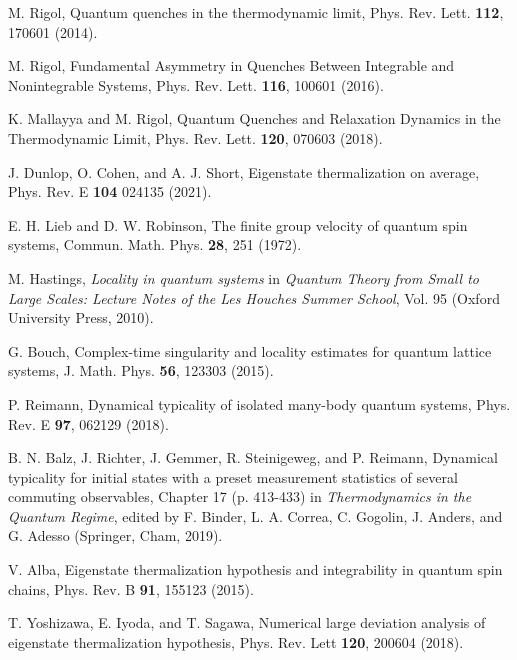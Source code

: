 \documentclass[twocolumn,aps,prb,floatfix,superscriptaddress]{revtex4-2}
\newcommand{\<}{\left\langle}	%
\renewcommand{\>}{\right\rangle}	%
\begin{document}
\begin{thebibliography}{70}
M. Rigol,
Quantum quenches in the thermodynamic limit,
Phys. Rev. Lett. {\bf 112}, 170601 (2014).

M. Rigol,
Fundamental Asymmetry in Quenches Between Integrable and Nonintegrable Systems,
Phys. Rev. Lett. {\bf 116}, 100601 (2016).

K. Mallayya and M. Rigol,
Quantum Quenches and Relaxation Dynamics in the Thermodynamic Limit,
Phys. Rev. Lett. {\bf 120}, 070603 (2018).

J. Dunlop, O. Cohen, and A. J. Short,
Eigenstate thermalization on average,
Phys. Rev. E {\bf 104}  024135 (2021).

E. H. Lieb and D. W. Robinson,
The finite group velocity of quantum spin systems,
Commun. Math. Phys. {\bf 28}, 251 (1972).

M. Hastings, {\em Locality in quantum systems} in {\em Quantum Theory from Small to Large Scales: Lecture Notes of the Les Houches Summer School}, Vol. 95 (Oxford University Press, 2010).

G. Bouch,
Complex-time singularity and locality estimates for quantum lattice systems,
J. Math. Phys. {\bf 56}, 123303 (2015).

P. Reimann,
Dynamical typicality of isolated many-body quantum systems,
Phys. Rev. E {\bf 97}, 062129 (2018).

B. N. Balz, J. Richter, J. Gemmer, R. Steinigeweg, and P. Reimann,
Dynamical typicality for initial states with a preset measurement 
statistics of several commuting observables,
Chapter 17 (p. 413-433) in {\em Thermodynamics in the Quantum Regime}, 
edited by F. Binder, L. A. Correa, C. Gogolin, J. Anders, and G. Adesso 
(Springer, Cham, 2019).

V. Alba,
Eigenstate thermalization hypothesis and integrability in quantum spin chains,
Phys. Rev. B {\bf 91}, 155123 (2015).

T. Yoshizawa, E. Iyoda, and T. Sagawa,
Numerical large deviation analysis of eigenstate thermalization hypothesis,
Phys. Rev. Lett {\bf 120}, 200604 (2018).



\end{thebibliography}
\end{document}
